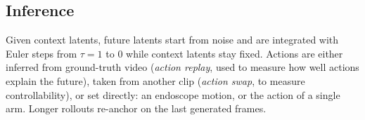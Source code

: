 \subsection{Inference}
Given context latents, future latents start from noise and are integrated with Euler steps from $\tau=1$ to $0$ while context latents stay fixed. Actions are either inferred from ground-truth video (\emph{action replay}, used to measure how well actions explain the future), taken from another clip (\emph{action swap}, to measure controllability), or set directly: an endoscope motion, or the action of a single arm. Longer rollouts re-anchor on the last generated frames.
